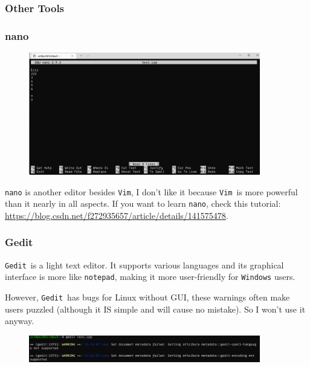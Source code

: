 \documentclass[12pt]{ctexart}
\begin{document}
\subsubsection{\textbf{Other Tools}}

\subsubsection*{\textbf{nano}}

\begin{figure}[H]
    \centering
    \includegraphics[width=0.9\textwidth,keepaspectratio]{assets/Linux/1.3 How to edit files on Linux/5.png}
\end{figure}

\texttt{nano} is another editor besides \texttt{Vim}, I
don't like it because \texttt{Vim}\ is more powerful than
it nearly in all aspects. If you want to learn \texttt{nano}, check this
tutorial:
\url{https://blog.csdn.net/f272935657/article/details/141575478}.

\subsubsection*{\textbf{Gedit}}

\texttt{Gedit}\ is a light text editor. It supports various languages and
its graphical interface is more like \texttt{notepad}, making it more
user-friendly for \texttt{Windows} users.

However, \texttt{Gedit}\ has bugs for Linux without GUI, these warnings
often make users puzzled (although it IS simple and will cause no
mistake). So I won't use it anyway.

\begin{figure}[H]
    \centering
    \includegraphics[width=0.9\textwidth,keepaspectratio]{assets/Linux/1.3 How to edit files on Linux/6.png}
\end{figure}
\end{document}
